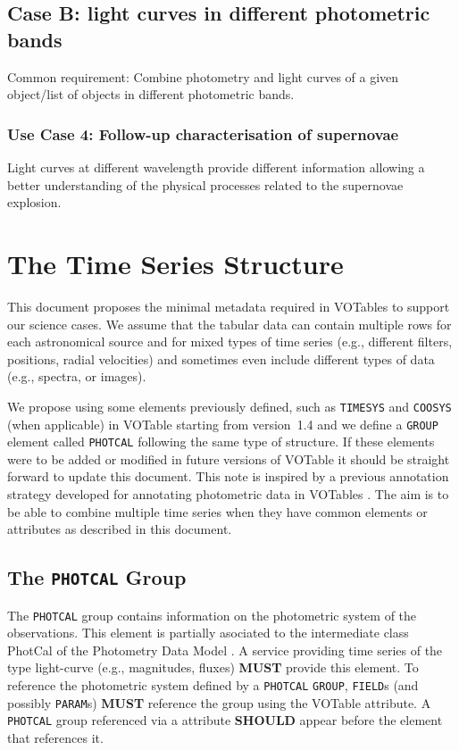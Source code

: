 \documentclass[11pt,a4paper]{ivoa} 
\let\fg=\color
\def\elem#1{{\tt{\fg{DarkRed}#1}}}
\begin{document}
\subsection{Case B: light curves in different photometric bands}
Common requirement: Combine photometry and light curves of a given
object/list of objects in different photometric bands.

\subsubsection{Use Case 4: Follow-up characterisation of supernovae}
Light curves at different wavelength provide different information
allowing a better understanding of the physical processes related to
the supernovae explosion.

\section{The Time Series Structure}
\label{elem:TIMESERIES}
This document proposes the minimal metadata required in VOTables to
support our science cases. We assume that the tabular data can contain
multiple rows for each astronomical source and for mixed types of time
series (e.g., different filters, positions, radial velocities) and
sometimes even include different types of data (e.g., spectra, or
images).

We propose using some elements previously defined, such as
\elem{TIMESYS} and \elem{COOSYS} (when applicable) in VOTable starting
from version~1.4 \citep{2019ivoa.spec.1021O} and we define a \elem{GROUP}
element called \elem{PHOTCAL} following the same type of structure.
If these elements
were to be added or modified in future versions of VOTable it should
be straight forward to update this document. This note is inspired by
a previous annotation strategy developed for annotating photometric
data in VOTables \citep{note:seb2010-1}. The aim is to be able to combine
multiple time series when they have common elements or attributes as
described in this document. 

%
%

\subsection{The \texttt{PHOTCAL} Group}
The \texttt{PHOTCAL} group contains information on the photometric
system of the observations. This element is partially asociated to the
intermediate class PhotCal of the Photometry Data Model
\citep{2013ivoa.spec.1005S}. A service providing time series of the
type light-curve (e.g., magnitudes, fluxes) \textbf{MUST} provide this
element. To reference the photometric system defined by a
\texttt{PHOTCAL} \elem{GROUP}, \elem{FIELD}s (and possibly
\elem{PARAM}s) \textbf{MUST} reference the group using the VOTable
 attribute. A \texttt{PHOTCAL} group referenced via a
 attribute \textbf{SHOULD} appear before the element that
references it.
\end{document}
